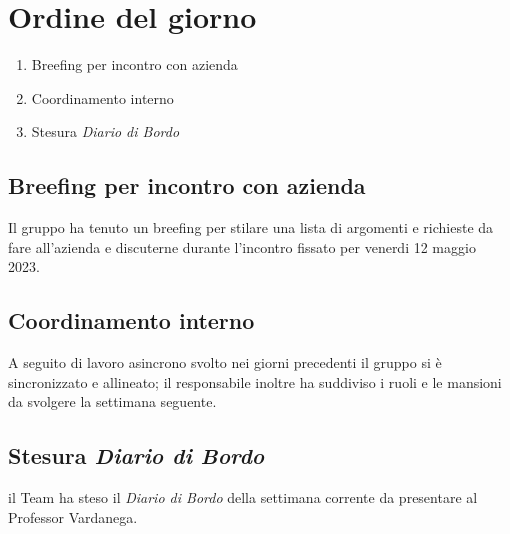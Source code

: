 \section{Ordine del giorno}
\begin{enumerate}
\item Breefing per incontro con azienda 
\item Coordinamento interno 
\item Stesura \textit{Diario di Bordo}
\end{enumerate}

\subsection{Breefing per incontro con azienda }
Il gruppo ha tenuto un breefing per stilare una lista di argomenti e richieste da fare all'azienda e discuterne durante l'incontro fissato per venerdi 12 maggio 2023.
\subsection{Coordinamento interno}
A seguito di lavoro asincrono svolto nei giorni precedenti il gruppo si è sincronizzato e allineato; il responsabile inoltre ha suddiviso i ruoli e le mansioni da svolgere la settimana seguente. 
\subsection{Stesura \textit{Diario di Bordo}}
il Team ha steso il \textit{Diario di Bordo} della settimana corrente da presentare al Professor Vardanega.